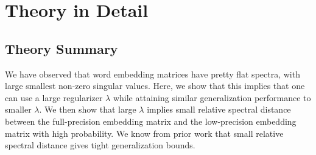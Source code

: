 \documentclass[12pt]{article}
\begin{document}
\section{Theory in Detail}
\subsection{Theory Summary}
We have observed that word embedding matrices have pretty flat spectra, with large smallest non-zero singular values.  Here, we show that this implies that one can use a large regularizer $\lambda$ while attaining similar generalization performance to smaller $\lambda$.  We then show that large $\lambda$ implies small relative spectral distance between the full-precision embedding matrix and the low-precision embedding matrix with high probability.  We know from prior work that small relative spectral distance gives tight generalization bounds.

	
\end{document}
